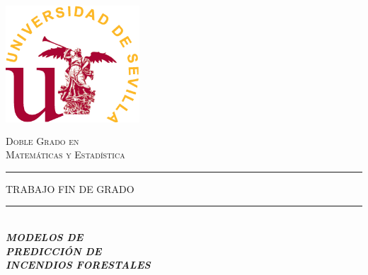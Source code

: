 \begin{titlepage}

\newcommand{\HRule}{\rule{\linewidth}{0.5mm}} %

\center %


\begin{minipage}{14cm}
\center

\includegraphics[width=5cm,height=5cm]{logo}\\[0.5cm] %


\textsc{\LARGE Doble Grado en \\[0.2cm]
Matemáticas y Estadística}\\[2.3cm] 



\rule[1.7mm]{2cm}{0.5mm}
\hfill
\textsc{\Large TRABAJO FIN DE GRADO} 
\hfill
\rule[1.7mm]{2cm}{0.5mm} 
\\[0.75cm]

{\Huge
\textbf{\textit{
MODELOS DE \\[0.2cm]
PREDICCIÓN DE \\[0.5cm] %
INCENDIOS FORESTALES  %
}}}\\[0.75cm] 


\end{minipage}
\end{titlepage}
